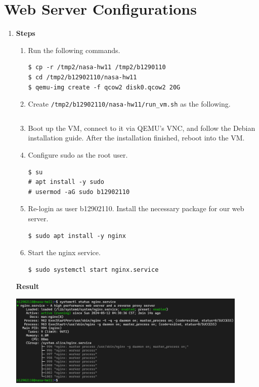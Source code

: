 \documentclass[12pt, a4paper]{article}
\begin{document}
  \section*{Web Server Configurations}
  \begin{enumerate}[resume]
    \item \textbf{Steps}
    \begin{enumerate}[label=(\arabic*)]
      \item Run the following commands.
      \begin{Verbatim}[frame=single]
$ cp -r /tmp2/nasa-hw11 /tmp2/b1290110
$ cd /tmp2/b12902110/nasa-hw11
$ qemu-img create -f qcow2 disk0.qcow2 20G
      \end{Verbatim}
      \item Create \verb|/tmp2/b12902110/nasa-hw11/run_vm.sh| as the following.
      \inputminted[fontsize=\scriptsize]{shell}{run_vm.sh}
      \item Boot up the VM, connect to it via QEMU's VNC, and follow the Debian installation guide. After the installation finished, reboot into the VM.
      \item Configure sudo as the root user.
      \begin{Verbatim}[frame=single]
$ su
# apt install -y sudo
# usermod -aG sudo b12902110
      \end{Verbatim}
      \item Re-login as user b12902110. Install the necessary package for our
      web server.
      \begin{Verbatim}[frame=single]
$ sudo apt install -y nginx
      \end{Verbatim}
      \item Start the nginx service.
      \begin{Verbatim}[frame=single]
$ sudo systemctl start nginx.service
      \end{Verbatim}
    \end{enumerate}

    \textbf{Result}

    \includegraphics[width=0.9\textwidth]{6_result.png}


\end{enumerate}
\end{document}
